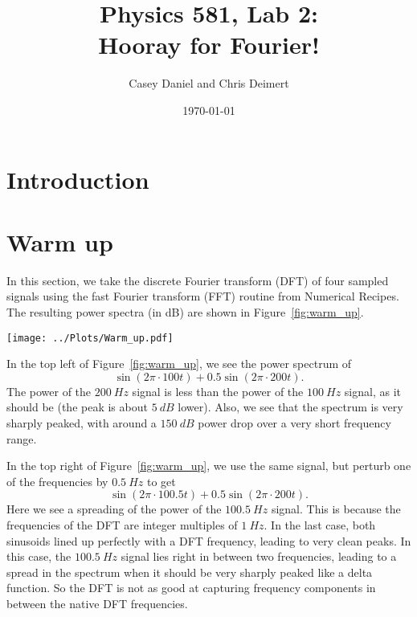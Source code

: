 \documentclass[twocolumn]{myarticle}
\begin{document}
\title{Physics 581, Lab 2:\\Hooray for Fourier!}
\author{Casey Daniel and Chris Deimert}
\date{\today}

\maketitle

\section{Introduction}
\label{sec:introduction}

\section{Warm up}
\label{sec:warm_up}

In this section, we take the discrete Fourier transform (DFT) of four sampled signals using the fast Fourier transform (FFT) routine from Numerical Recipes.
The resulting power spectra (in dB) are shown in Figure~\ref{fig:warm_up}.

\begin{figure*}[htpb]
    \centering
    \texttt{[image: ../Plots/Warm\_up.pdf]}
    \caption{%
        The power spectra of the DFT's of four signals.
        Each signal was sampled at $ t = i/1024 $ for $ i = 1, 2, \ldots, 1024 $.
        The frequencies resulting from the discrete Fourier transform are then $ f = -511, -510, \ldots, 512 $.
    }
    \label{fig:warm_up}
\end{figure*}

In the top left of Figure~\ref{fig:warm_up}, we see the power spectrum of 
\[ 
    \sin(2 \pi \cdot 100 t) + 0.5 \sin (2 \pi \cdot 200 t) . 
\]
The power of the $ \SI{200}{Hz} $ signal is less than the power of the $ \SI{100}{Hz} $ signal, as it should be (the peak is about $ \SI{5}{dB} $ lower).
Also, we see that the spectrum is very sharply peaked, with around a $ \SI{150}{dB} $ power drop over a very short frequency range.

In the top right of Figure~\ref{fig:warm_up}, we use the same signal, but perturb one of the frequencies by $ \SI{0.5}{Hz} $ to get
\[
    \sin(2 \pi \cdot 100.5 t) + 0.5 \sin (2 \pi \cdot 200 t) . 
\]
Here we see a spreading of the power of the $ \SI{100.5}{Hz} $ signal.
This is because the frequencies of the DFT are integer multiples of $ \SI{1}{Hz} $.
In the last case, both sinusoids lined up perfectly with a DFT frequency, leading to very clean peaks. 
In this case, the $ \SI{100.5}{Hz} $ signal lies right in between two frequencies, leading to a spread in the spectrum when it should be very sharply peaked like a delta function.
So the DFT is not as good at capturing frequency components in between the native DFT frequencies.
\end{document}
